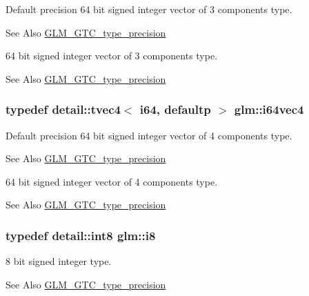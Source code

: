 Default precision 64 bit signed integer vector of 3 components type. \begin{DoxySeeAlso}{See Also}
\hyperlink{group__gtc__type__precision}{G\-L\-M\-\_\-\-G\-T\-C\-\_\-type\-\_\-precision}
\end{DoxySeeAlso}
64 bit signed integer vector of 3 components type. \begin{DoxySeeAlso}{See Also}
\hyperlink{group__gtc__type__precision}{G\-L\-M\-\_\-\-G\-T\-C\-\_\-type\-\_\-precision} 
\end{DoxySeeAlso}
\hypertarget{group__gtc__type__precision_ga19846034cab6ee6e031884ea30def7fc}{
\subsubsection[{i64vec4}]{\setlength{\rightskip}{0pt plus 5cm}typedef detail\-::tvec4$<$ i64, defaultp $>$ {\bf glm\-::i64vec4}}}\label{group__gtc__type__precision_ga19846034cab6ee6e031884ea30def7fc}
Default precision 64 bit signed integer vector of 4 components type. \begin{DoxySeeAlso}{See Also}
\hyperlink{group__gtc__type__precision}{G\-L\-M\-\_\-\-G\-T\-C\-\_\-type\-\_\-precision}
\end{DoxySeeAlso}
64 bit signed integer vector of 4 components type. \begin{DoxySeeAlso}{See Also}
\hyperlink{group__gtc__type__precision}{G\-L\-M\-\_\-\-G\-T\-C\-\_\-type\-\_\-precision} 
\end{DoxySeeAlso}
\hypertarget{group__gtc__type__precision_gaae064be68b7d36cd7910c16e8ad18bba}{
\subsubsection[{i8}]{\setlength{\rightskip}{0pt plus 5cm}typedef detail\-::int8 {\bf glm\-::i8}}}\label{group__gtc__type__precision_gaae064be68b7d36cd7910c16e8ad18bba}
8 bit signed integer type. \begin{DoxySeeAlso}{See Also}
\hyperlink{group__gtc__type__precision}{G\-L\-M\-\_\-\-G\-T\-C\-\_\-type\-\_\-precision} 
\end{DoxySeeAlso}
